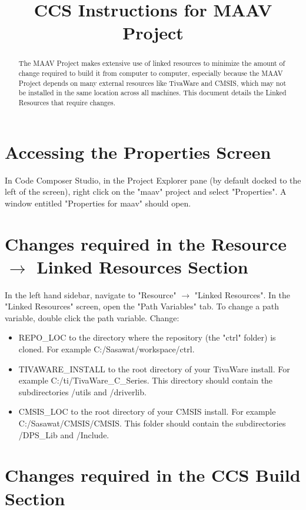 \documentclass[]{article}
\title{CCS Instructions for MAAV Project}
\begin{document}
\maketitle

\begin{abstract}

The MAAV Project makes extensive use of linked resources to minimize the amount of change required to build it from computer to computer, especially because the MAAV Project depends on many external resources like TivaWare and CMSIS, which may not be installed in the same location across all machines. This document details the Linked Resources that require changes. 

\end{abstract}

\section{Accessing the Properties Screen}

In Code Composer Studio, in the Project Explorer pane (by default docked to the left of the screen), right click on the "maav" project and select "Properties". A window entitled "Properties for maav" should open. 

\section{Changes required in the Resource $\rightarrow$ Linked Resources Section}

In the left hand sidebar, navigate to "Resource" $\rightarrow$ "Linked Resources". In the "Linked Resources" screen, open the "Path Variables" tab. To change a path variable, double click the path variable. Change:
\begin{itemize}
\item REPO\_LOC to the directory where the repository (the "ctrl" folder) is cloned. For example C:/Sasawat/workspace/ctrl. 
\item TIVAWARE\_INSTALL to the root directory of your TivaWare install. For example C:/ti/TivaWare\_C\_Series. This directory should contain the subdirectories /utils and /driverlib. 
\item CMSIS\_LOC to the root directory of your CMSIS install. For example C:/Sasawat/CMSIS/CMSIS. This folder should contain the subdirectories /DPS\_Lib and /Include. 
\end{itemize}

\section{Changes required in the CCS Build Section}
\end{document}
